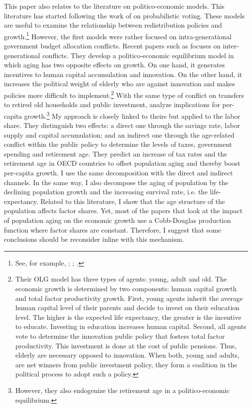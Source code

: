 This paper also relates to the literature on politico-economic models. This literature has started following the work of \cite{Lindbeck1987} on probabilistic voting. These models are useful to examine the relationship between redistribution policies and growth.\footnote{See, for example, \cite{Alesina1994}; \cite{Persson1994}; \cite{Krusell1997}.} However, the first models were rather focused on intra-generational government budget allocation conflicts. 
Recent papers such as \cite{Lancia2012} focuses on inter-generational conflicts. They develop a politico-economic equilibrium model in which aging has two opposite effects on growth. On one hand, it generates incentives to human capital accumulation and innovation. On the other hand, it increases the political weight of elderly who are against innovation and makes policies more difficult to implement.\footnote{Their OLG model has three types of agents: young, adult and old. The economic growth is determined by two components: human capital growth and total factor productivity growth. First, young agents inherit the average human capital level of their parents and decide to invest on their education level. The higher is the expected life expectancy, the greater is the incentive to educate. Investing in education increases human capital. Second, all agents vote to determine the innovation public policy that fosters total factor productivity. This investment is done at the cost of public pensions. Thus, elderly are necessary opposed to innovation. When both, young and adults, are net winners from public investment policy, they form a coalition in the political process to adopt such a policy.} 
With the same type of conflict on transfers to retired old households and public investment, \cite{Gonzalez-Eiras2012} analyze implications for per-capita growth.\footnote{However, they also endogenize the retirement age in a politico-economic equilibrium.} My approach is closely linked to theirs but applied to the labor share. They distinguish two effects: a direct one through the savings rate, labor supply and capital accumulation; and an indirect one through the age-related conflict within the public policy to determine the levels of taxes, government spending and retirement age. They predict an increase of tax rates and the retirement age in OECD countries to offset population aging and thereby boost per-capita growth. I use the same decomposition with the direct and indirect channels. In the same way, I also decompose the aging of population by the declining population growth and the increasing survival rate, i.e. the life-expectancy.
Related to this literature, I show that the age structure of the population affects factor shares. Yet, most of the papers that look at the impact of population aging on the economic growth use a Cobb-Douglas production function where factor shares are constant. Therefore, I suggest that some conclusions should be reconsider inline with this mechanism.

